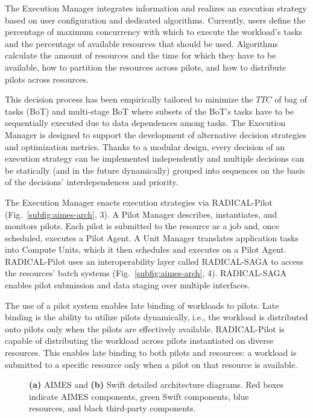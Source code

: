 \documentclass[10pt, conference, compsocconf]{IEEEtran}
\newcommand{\B}[1]{\textbf{#1}\xspace}
\begin{document}
The Execution Manager integrates information and realizes an execution strategy
based on user configuration and dedicated algorithms. Currently, users define
the percentage of maximum concurrency with which to execute the workload's tasks
and the percentage of available resources that should be used. Algorithms
calculate the amount of resources and the time for which they have to be
available, how to partition the resources across pilots, and how to distribute
pilots across resources.

This decision process has been empirically tailored to minimize the \(TTC\) of
bag of tasks (BoT) and multi-stage BoT where subsets of the BoT's tasks have to
be sequentially executed due to data dependences among tasks. The Execution
Manager is designed to support the development of alternative decision
strategies and optimization metrics. Thanks to a modular design, every decision
of an execution strategy can be implemented independently and multiple decisions
can be statically (and in the future dynamically) grouped into sequences on the
basis of the decisions' interdependences and priority.

The Execution Manager enacts execution strategies via RADICAL-Pilot
(Fig.~\ref{subfig:aimes-arch}, 3). A Pilot Manager describes, instantiates, and
monitors pilots. Each pilot is submitted to the resource as a job and, once
scheduled, executes a Pilot Agent. A Unit Manager translates application tasks
into Compute Units, which it then schedules and executes on a Pilot Agent.
RADICAL-Pilot uses an interoperability layer called RADICAL-SAGA to access the
resources' batch systems (Fig.~\ref{subfig:aimes-arch}, 4). RADICAL-SAGA enables
pilot submission and data staging over multiple interfaces.

The use of a pilot system enables late binding of workloads to pilots. Late
binding is the ability to utilize pilots dynamically, i.e., the workload is
distributed onto pilots only when the pilots are effectively available.
RADICAL-Pilot is capable of distributing the workload across pilots instantiated
on diverse resources. This enables late binding to both pilots and resources: a
workload is submitted to a specific resource only when a pilot on that resource
is available.

\begin{figure}[t]
  \caption{ \B{(a)} AIMES and \B{(b)} Swift detailed architecture diagrams.
            Red boxes indicate AIMES components, green Swift components, blue
            resources, and black third-party components.\label{fig:archs}}
\end{figure}
\end{document}
